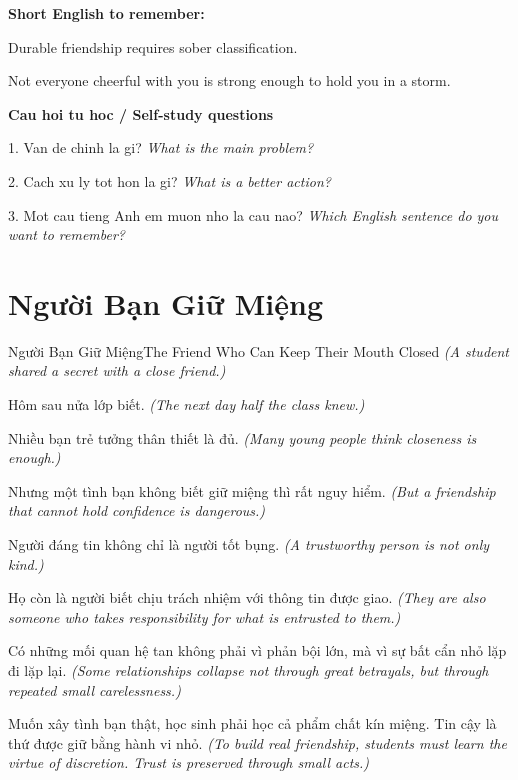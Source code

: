 \begin{ghinhoanh}
\textbf{Short English to remember:}

Durable friendship requires sober classification.

Not everyone cheerful with you is strong enough to hold you in a storm.

\end{ghinhoanh}

\begin{tuhocnhanh}
\textbf{Cau hoi tu hoc / Self-study questions}

1. Van de chinh la gi? \textit{What is the main problem?}

2. Cach xu ly tot hon la gi? \textit{What is a better action?}

3. Mot cau tieng Anh em muon nho la cau nao? \textit{Which English sentence do you want to remember?}
\end{tuhocnhanh}
\ngancach

\section{Người Bạn Giữ Miệng}
\begin{truyen}{Người Bạn Giữ Miệng}{The Friend Who Can Keep Their Mouth Closed}
\textit{(A student shared a secret with a close friend.)}

Hôm sau nửa lớp biết.
\textit{(The next day half the class knew.)}

Nhiều bạn trẻ tưởng thân thiết là đủ.
\textit{(Many young people think closeness is enough.)}

Nhưng một tình bạn không biết giữ miệng thì rất nguy hiểm.
\textit{(But a friendship that cannot hold confidence is dangerous.)}

Người đáng tin không chỉ là người tốt bụng.
\textit{(A trustworthy person is not only kind.)}

Họ còn là người biết chịu trách nhiệm với thông tin được giao.
\textit{(They are also someone who takes responsibility for what is entrusted to them.)}

Có những mối quan hệ tan không phải vì phản bội lớn, mà vì sự bất cẩn nhỏ lặp đi lặp lại.
\textit{(Some relationships collapse not through great betrayals, but through repeated small carelessness.)}

\end{truyen}

\begin{baihoc}
Muốn xây tình bạn thật, học sinh phải học cả phẩm chất kín miệng. Tin cậy là thứ được giữ bằng hành vi nhỏ.
\textit{(To build real friendship, students must learn the virtue of discretion. Trust is preserved through small acts.)}
\end{baihoc}

